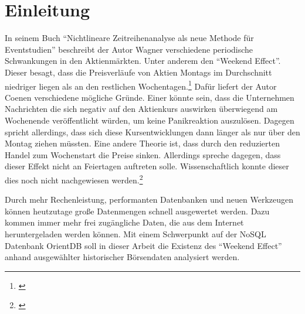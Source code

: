\section{Einleitung}


In seinem Buch \enquote{Nichtlineare Zeitreihenanalyse als neue Methode für Eventstudien} beschreibt der Autor Wagner verschiedene periodische Schwankungen in den Aktienmärkten. Unter anderem den \enquote{Weekend Effect}. Dieser besagt, dass die Preisverläufe von Aktien Montags im Durchschnitt niedriger liegen als an den restlichen Wochentagen.\footnote{\cite[Vgl.][17]{Wagner2019}} Dafür liefert der Autor Coenen verschiedene mögliche Gründe. Einer könnte sein, dass die Unternehmen Nachrichten die sich negativ auf den Aktienkurs auswirken überwiegend am Wochenende veröffentlicht würden, um keine Panikreaktion auszulösen. Dagegen spricht allerdings, dass sich diese Kursentwicklungen dann länger als nur über den Montag ziehen müssten. Eine andere Theorie ist, dass durch den reduzierten Handel zum Wochenstart die Preise sinken. Allerdings spreche dagegen, dass dieser Effekt nicht an Feiertagen auftreten solle. Wissenschaftlich konnte dieser dies noch nicht nachgewiesen werden.\footnote{\cite[Vgl.][8]{Coenen2020}}

Durch mehr Rechenleistung, performanten Datenbanken und neuen Werkzeugen können heutzutage große Datenmengen schnell ausgewertet werden. Dazu kommen immer mehr frei zugängliche Daten, die aus dem Internet heruntergeladen werden können. Mit einem Schwerpunkt auf der NoSQL Datenbank OrientDB soll in dieser Arbeit die Existenz des \enquote{Weekend Effect} anhand ausgewählter historischer Börsendaten analysiert werden.

\clearpage